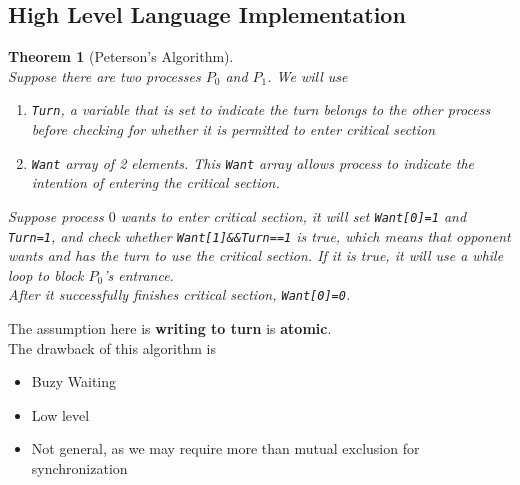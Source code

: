 \documentclass[12pt]{article}
\newtheorem{theorem}{Theorem}[section]
\theoremstyle{definition}
\begin{document}
\subsection{High Level Language Implementation}
\begin{theorem}[Peterson's Algorithm]
\hfill\\\normalfont Suppose there are two processes $P_0$ and $P_1$. We will use 
\begin{enumerate}
  \item \texttt{Turn}, a variable that is set to indicate the turn belongs to the other process before checking for whether it is permitted to enter critical section
  \item \texttt{Want} array of 2 elements. This \texttt{Want} array allows process to indicate the intention of entering the critical section.
\end{enumerate}
Suppose process $0$ wants to enter critical section, it will set \texttt{Want[0]=1} and \texttt{Turn=1}, and check whether \texttt{Want[1]\&\&Turn==1} is true, which means that opponent wants and has the turn to use the critical section. If it is true, it will use a while loop to block $P_0$'s entrance.\\
After it successfully finishes critical section, \texttt{Want[0]=0}.
\end{theorem}
The assumption here is \textbf{writing to turn} is \textbf{atomic}.\\
The drawback of this algorithm is 
\begin{itemize}
  \item Buzy Waiting
  \item Low level
  \item Not general, as we may require more than mutual exclusion for synchronization
\end{itemize}
\end{document}
